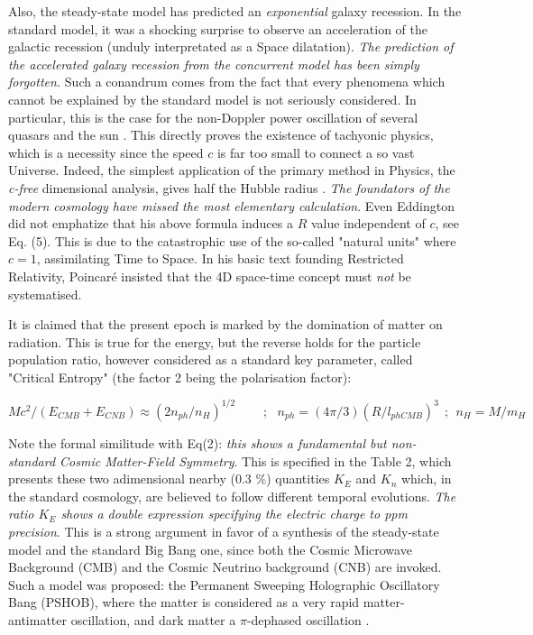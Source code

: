 \documentclass[a4paper,9pt]{article}
\newcounter{row}
\begin{document}
Also, the steady-state model has predicted an \textit{exponential} galaxy recession. In the standard model, it was a shocking surprise to observe an acceleration of the galactic recession (unduly interpretated as a Space dilatation). \textit{The prediction of the accelerated galaxy recession from the concurrent model has been simply forgotten.} Such a conandrum comes from the fact that every phenomena which cannot be explained by the standard model is not seriously considered. In particular, this is the case for the non-Doppler power oscillation of several quasars and the sun \cite{Kotov}. This directly proves the existence of tachyonic physics, which is a necessity since the speed $c$ is far too small to connect a so vast Universe. Indeed, the simplest application of the primary method in Physics, the \textit {c-free} dimensional analysis, gives half the Hubble radius \cite {Sanchez3}. \textit{The foundators of the modern cosmology have missed the most elementary calculation}. Even Eddington did not emphatize that his above formula induces a $R$ value independent of $c$, see Eq. (5). This is due to the catastrophic use of the so-called "natural units" where $c = 1$, assimilating Time to Space. In his basic text founding Restricted Relativity, Poincaré \cite{Poincare3} insisted that the 4D space-time concept must \textit{not} be systematised.  

It is claimed that the present epoch is marked by the domination of matter on radiation. This is true for the energy, but the reverse holds for the particle population ratio, however considered as a standard key parameter, called "Critical Entropy" (the factor 2 being the polarisation factor):

\begin{equation}\label{Eq2}
Mc^2 /(E_{CMB} + E_{CNB}) \approx (2n_{ph}/n_H)^{1/2}~~~~~~~~~~; ~~~ n_{ph} = (4\pi/3)(R/l_{phCMB})^3    ~~;~~ n_ H= M/m_H
 \end{equation}

Note the formal similitude with Eq(2): \textit {this shows a fundamental but non-standard Cosmic Matter-Field Symmetry}. This is specified in the Table 2, which presents these two adimensional nearby (0.3 \%) quantities $K_E$ and $K_n$ which, in the standard cosmology, are believed to follow different temporal evolutions. \textit {The ratio $K_E$ shows a double expression specifying the electric charge to ppm precision}. This is a strong argument in favor of a synthesis of the steady-state model and the standard Big Bang one, since both the Cosmic Microwave Background (CMB) and the Cosmic Neutrino background (CNB) are invoked. Such a model was proposed: the Permanent Sweeping Holographic Oscillatory Bang (PSHOB), where the matter is considered as a very rapid matter-antimatter oscillation, and dark matter a $\pi$-dephased oscillation \cite{Sanchez5} \cite{Sanchez4}.
\end{document}
